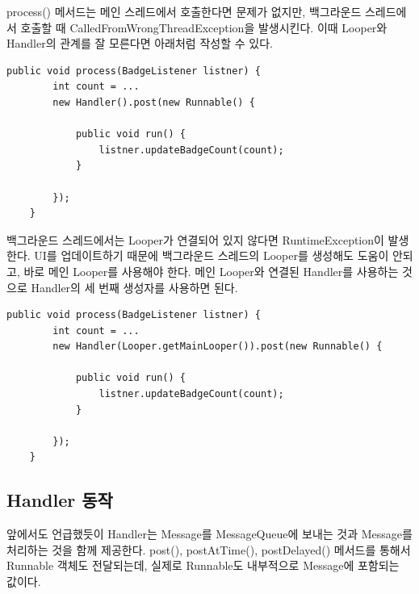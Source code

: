 process() 메서드는 메인 스레드에서 호출한다면 문제가 없지만, 백그라운드 스레드에서 호출할 때 CalledFromWrongThreadException을 발생시킨다. 
이때 Looper와 Handler의 관계를 잘 모른다면 아래처럼 작성할 수 있다.
\begin{lstlisting}[frame=single] 
	public void process(BadgeListener listner) {
		int count = ...
		new Handler().post(new Runnable() {
		
			public void run() {
				listner.updateBadgeCount(count);
			}
			
		});
	}
\end{lstlisting}	
백그라운드 스레드에서는 Looper가 연결되어 있지 않다면 RuntimeException이 발생한다.
UI를 업데이트하기 때문에 백그라운드 스레드의 Looper를 생성해도 도움이 안되고, 바로 메인 Looper를 사용해야 한다. 
메인 Looper와 연결된 Handler를 사용하는 것으로 Handler의 세 번째 생성자를 사용하면 된다.
\begin{lstlisting}[frame=single] 
	public void process(BadgeListener listner) {
		int count = ...
		new Handler(Looper.getMainLooper()).post(new Runnable() {
		
			public void run() {
				listner.updateBadgeCount(count);
			}
			
		});
	}
\end{lstlisting}

\subsection{Handler 동작}
앞에서도 언급했듯이 Handler는 Message를 MessageQueue에 보내는 것과 Message를 처리하는 것을 함께 제공한다. 
post(), postAtTime(), postDelayed() 메서드를 통해서 Runnable 객체도 전달되는데, 실제로 Runnable도 내부적으로 Message에 포함되는 값이다.\\


